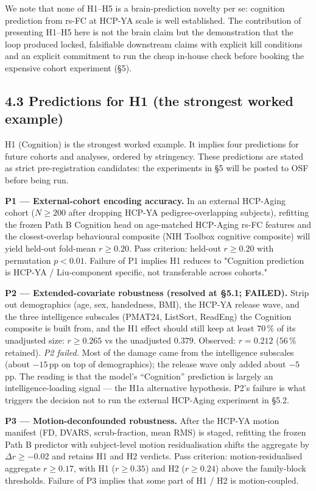 \documentclass[11pt,letterpaper]{report}
\begin{document}
We note that none of H1--H5 is a brain-prediction novelty per se: cognition prediction from rs-FC at HCP-YA scale is well established. The contribution of presenting H1--H5 here is not the brain claim but the demonstration that the loop produced locked, falsifiable downstream claims with explicit kill conditions and an explicit commitment to run the cheap in-house check before booking the expensive cohort experiment (\S5).

\subsection*{4.3 Predictions for H1 (the strongest worked example)}

H1 (Cognition) is the strongest worked example. It implies four predictions for future cohorts and analyses, ordered by stringency. These predictions are stated as strict pre-registration candidates: the experiments in \S5 will be posted to OSF before being run.

\textbf{P1 --- External-cohort encoding accuracy.} In an external HCP-Aging cohort ($N \ge 200$ after dropping HCP-YA pedigree-overlapping subjects), refitting the frozen Path B Cognition head on age-matched HCP-Aging rs-FC features and the closest-overlap behavioural composite (NIH Toolbox cognitive composite) will yield held-out fold-mean $r \ge 0.20$. Pass criterion: held-out $r \ge 0.20$ with permutation $p < 0.01$. Failure of P1 implies H1 reduces to "Cognition prediction is HCP-YA / Liu-component specific, not transferable across cohorts."

\textbf{P2 --- Extended-covariate robustness (resolved at \S5.1; FAILED).} Strip out demographics (age, sex, handedness, BMI), the HCP-YA release wave, and the three intelligence subscales (PMAT24, ListSort, ReadEng) the Cognition composite is built from, and the H1 effect should still keep at least $70\,\%$ of its unadjusted size: $r \ge 0.265$ vs the unadjusted $0.379$. Observed: $r = 0.212$ ($56\,\%$ retained). \emph{P2 failed.} Most of the damage came from the intelligence subscales (about $-15$\,pp on top of demographics); the release wave only added about $-5$\,pp. The reading is that the model's ``Cognition'' prediction is largely an intelligence-loading signal --- the H1a alternative hypothesis. P2's failure is what triggers the decision not to run the external HCP-Aging experiment in \S5.2.

\textbf{P3 --- Motion-deconfounded robustness.} After the HCP-YA motion manifest (FD, DVARS, scrub-fraction, mean RMS) is staged, refitting the frozen Path B predictor with subject-level motion residualisation shifts the aggregate by $\Delta r \ge -0.02$ and retains H1 and H2 verdicts. Pass criterion: motion-residualised aggregate $r \ge 0.17$, with H1 ($r \ge 0.35$) and H2 ($r \ge 0.24$) above the family-block thresholds. Failure of P3 implies that some part of H1 / H2 is motion-coupled.
\end{document}
